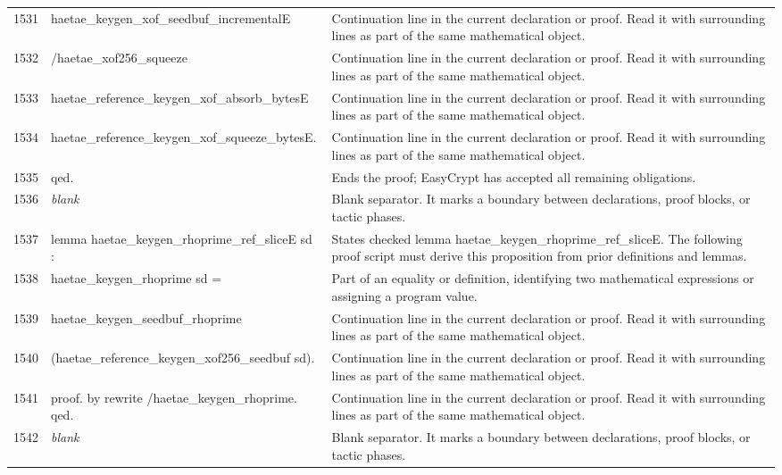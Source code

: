 \documentclass[10pt]{article}
\begin{document}
\begin{longtable}{r L{0.53\textwidth} L{0.37\textwidth}}
1531 & {\ttfamily\scriptsize            haetae\_keygen\_xof\_seedbuf\_incrementalE} & Continuation line in the current declaration or proof.  Read it with surrounding lines as part of the same mathematical object. \\
1532 & {\ttfamily\scriptsize            /haetae\_xof256\_squeeze} & Continuation line in the current declaration or proof.  Read it with surrounding lines as part of the same mathematical object. \\
1533 & {\ttfamily\scriptsize            haetae\_reference\_keygen\_xof\_absorb\_bytesE} & Continuation line in the current declaration or proof.  Read it with surrounding lines as part of the same mathematical object. \\
1534 & {\ttfamily\scriptsize            haetae\_reference\_keygen\_xof\_squeeze\_bytesE.} & Continuation line in the current declaration or proof.  Read it with surrounding lines as part of the same mathematical object. \\
1535 & {\ttfamily\scriptsize qed.} & Ends the proof; EasyCrypt has accepted all remaining obligations. \\
1536 & {\ttfamily\scriptsize \emph{blank}} & Blank separator.  It marks a boundary between declarations, proof blocks, or tactic phases. \\
1537 & {\ttfamily\scriptsize lemma haetae\_keygen\_rhoprime\_ref\_sliceE sd :} & States checked lemma haetae\_keygen\_rhoprime\_ref\_sliceE.  The following proof script must derive this proposition from prior definitions and lemmas. \\
1538 & {\ttfamily\scriptsize   haetae\_keygen\_rhoprime sd =} & Part of an equality or definition, identifying two mathematical expressions or assigning a program value. \\
1539 & {\ttfamily\scriptsize   haetae\_keygen\_seedbuf\_rhoprime} & Continuation line in the current declaration or proof.  Read it with surrounding lines as part of the same mathematical object. \\
1540 & {\ttfamily\scriptsize     (haetae\_reference\_keygen\_xof256\_seedbuf sd).} & Continuation line in the current declaration or proof.  Read it with surrounding lines as part of the same mathematical object. \\
1541 & {\ttfamily\scriptsize proof. by rewrite /haetae\_keygen\_rhoprime. qed.} & Continuation line in the current declaration or proof.  Read it with surrounding lines as part of the same mathematical object. \\
1542 & {\ttfamily\scriptsize \emph{blank}} & Blank separator.  It marks a boundary between declarations, proof blocks, or tactic phases. \\

\end{longtable}
\end{document}
